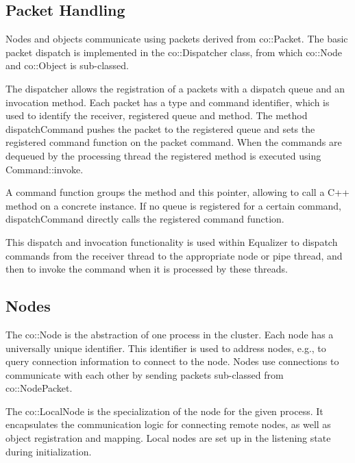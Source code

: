 \documentclass[10pt,a4]{scrartcl}
\begin{document}
\subsection{Packet Handling}

Nodes and objects communicate using packets derived from
\textsf{co::Packet}. The basic packet dispatch is implemented in the
\textsf{co::Dispatcher} class, from which \textsf{co::Node} and \textsf{co::Object} is sub-classed.

The dispatcher allows the registration of a packets with a dispatch queue and an
invocation method. Each packet has a type and command identifier, which is used
to identify the receiver, registered queue and method. The method
\textsf{dispatchCommand} pushes the packet to the registered queue and sets the
registered command function on the packet command. When the
commands are dequeued by the processing thread the registered method is executed
using \textsf{Command::invoke}.

A command function groups the method and \textsf{this} pointer, allowing
to call a C++ method on a concrete instance. If no queue is registered
for a certain command, \textsf{dispatchCommand} directly calls the
registered command function.

This dispatch and invocation functionality is used within Equalizer to
dispatch commands from the receiver thread to the appropriate node or
pipe thread, and then to invoke the command when it is processed by
these threads.

\subsection{Nodes}

The \textsf{co::Node} is the abstraction of one process in the cluster. Each
node has a universally unique identifier. This identifier is used to address
nodes, e.g., to query connection information to connect to the node. Nodes use
connections to communicate with each other by sending packets sub-classed from
\textsf{co::NodePacket}.

The \textsf{co::LocalNode} is the specialization of the node for the given
process. It encapsulates the communication logic for connecting remote nodes, as
well as object registration and mapping. Local nodes are set up in the listening
state during initialization.
\end{document}

